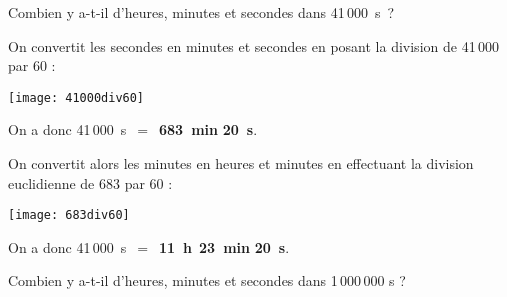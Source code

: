 

\begin{methode*1}

\begin{exemple*1}
Combien y a-t-il d'heures, minutes et secondes dans 41\,000 s ? \\[1em]
\begin{minipage}[t]{.46\textwidth}
On convertit les secondes en minutes et secondes en posant la division de 41\,000 par 60 :

\begin{center}\texttt{[image: 41000div60]} \end{center}

On a donc 41\,000 s $=$ \textcolor{rose}{\textbf{683 min}} \textcolor{vert}{\textbf{20 s}}.
\end{minipage}\hfill%
\begin{minipage}[t]{.46\textwidth}
On convertit alors les minutes en heures et minutes en effectuant la division euclidienne de 683 par 60 :

\begin{center}\texttt{[image: 683div60]} \end{center}
On a donc 41\,000 s $=$ \textcolor{bleu}{\textbf{11 h}} \textcolor{rose}{\textbf{23 min}} \textcolor{vert}{\textbf{20 s}}.
\end{minipage}


\end{exemple*1}

\exercice

Combien y a-t-il d'heures, minutes et secondes dans 1\,000\,000 s ?

\end{methode*1}


